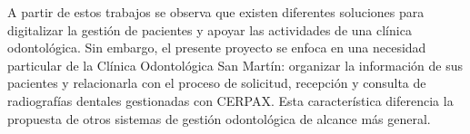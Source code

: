 	A partir de estos trabajos se observa que existen diferentes soluciones para
	digitalizar la gestión de pacientes y apoyar las actividades de una clínica
	odontológica. Sin embargo, el presente proyecto se enfoca en una necesidad
	particular de la Clínica Odontológica San Martín: organizar la información
	de sus pacientes y relacionarla con el proceso de solicitud, recepción y
	consulta de radiografías dentales gestionadas con CERPAX. Esta característica
	diferencia la propuesta de otros sistemas de gestión odontológica de alcance
	más general.
	
		
		
			
			
			
			
			
			
			
		
		
	
	
	
